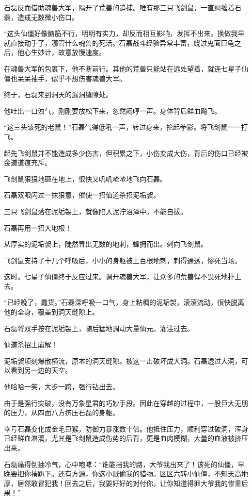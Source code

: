 \begin{this_body}
石磊反而借助魂兽大军，隔开了荒兽的追捕。唯有那三只飞剑鼠，一直纠缠着石磊，造成无数微小伤口。

“这头仙僵好像脑筋不行，明明有实力，却反而相互影响，发挥不出来。换做我早就直接动手了，哪管什么魂兽的死活。”石磊战斗经验异常丰富，绕过鬼面巨龟之后，他心生妙计，故意放慢速度。

在魂兽大军的包裹下，他不断前行。其他的荒兽只能站在远处望着，就连七星子仙僵也呆呆袖手，似乎不想伤害魂兽大军。

终于，石磊来到洞天的漏洞缝隙处。

他吐出一口浊气，刚刚要放松下来，忽然闷哼一声。身体背后鲜血飚飞。

“这三头该死的老鼠！”石磊气得低吼一声，转过身来，抡起拳影。将飞剑鼠一一打飞。

起先飞剑鼠并不能造成多少伤害，但积累之下，小伤变成大伤，背后的伤口已经被金道道痕充斥。

飞剑鼠狠狠地砸在地上，很快又叽叽喳喳地飞向石磊。

石磊双眼闪过一抹狠意，催使一招仙道杀招泥垢袈。

三只飞剑鼠落在泥垢袈上，就像陷入泥泞沼泽中。不能自拔。

石磊再用一招大地根！

从厚实的泥垢袈上，陡然冒出无数的地刺，蜂拥而出。刺向飞剑鼠。

飞剑鼠支持了十几个呼吸后，小小的身躯被上百根地刺，刺得通透，惨死当场。

这时。七星子仙僵终于反应过来。调开魂兽大军，让众多的荒兽悍不畏死地扑上去。

“已经晚了，蠢货。”石磊深呼吸一口气，身上粘稠的泥垢袈，滚滚流动，很快脱离他的全身，覆盖到洞天缝隙上。

石磊将双手按在泥垢袈上，随后猛地调动大量仙元。灌注过去。

仙道杀招土崩解！

泥垢袈顷刻爆散横流，原本的洞天缝隙。被这一击破坏成大洞。石磊透过大洞，可以看到另一边的天空。

他哈哈一笑，大步一跨，强行钻出去。

由于是强行突破，没有万象星君的巧妙手段。因此在穿越的过程中，一股巨大无朋的压力，从四面八方挤压石磊的身躯。

幸亏石磊变化成金毛巨猴，防御力暴涨数十倍。他抵住压力，顺利穿过破洞，浑身已经鲜血淋漓，尤其是飞剑鼠造成伤势的后背，更是血肉模糊，大量的血液被挤压出来。

石磊痛得倒抽冷气，心中咆哮：“谁能挡我的路，大爷我出来了！该死的仙僵，早晚要把你揍趴下。还有方源，你这小贼偷我的猎物。区区六转小仙僵，不知天高地厚，居然敢冒犯我！回去之后，我要好好的对付你，让你知道得罪大爷我的惨重后果！”


\end{this_body}
